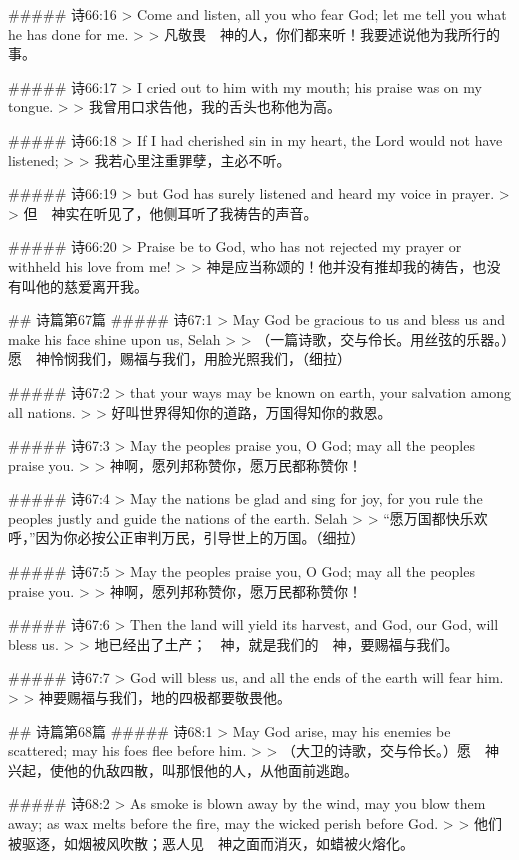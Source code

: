 ##### 诗66:16
> Come and listen, all you who fear God; let me tell you what he has done for me.
>
> 凡敬畏　神的人，你们都来听！我要述说他为我所行的事。


##### 诗66:17
> I cried out to him with my mouth; his praise was on my tongue.
>
> 我曾用口求告他，我的舌头也称他为高。


##### 诗66:18
> If I had cherished sin in my heart, the Lord would not have listened;
>
> 我若心里注重罪孽，主必不听。


##### 诗66:19
> but God has surely listened and heard my voice in prayer.
>
> 但　神实在听见了，他侧耳听了我祷告的声音。


##### 诗66:20
> Praise be to God, who has not rejected my prayer or withheld his love from me!
>
> 神是应当称颂的！他并没有推却我的祷告，也没有叫他的慈爱离开我。


## 诗篇第67篇
##### 诗67:1
> May God be gracious to us and bless us and make his face shine upon us, Selah
>
> （一篇诗歌，交与伶长。用丝弦的乐器。）愿　神怜悯我们，赐福与我们，用脸光照我们，（细拉）


##### 诗67:2
> that your ways may be known on earth, your salvation among all nations.
>
> 好叫世界得知你的道路，万国得知你的救恩。


##### 诗67:3
> May the peoples praise you, O God; may all the peoples praise you.
>
> 神啊，愿列邦称赞你，愿万民都称赞你！


##### 诗67:4
> May the nations be glad and sing for joy, for you rule the peoples justly and guide the nations of the earth. Selah
>
> “愿万国都快乐欢呼，”因为你必按公正审判万民，引导世上的万国。（细拉）


##### 诗67:5
> May the peoples praise you, O God; may all the peoples praise you.
>
> 神啊，愿列邦称赞你，愿万民都称赞你！


##### 诗67:6
> Then the land will yield its harvest, and God, our God, will bless us.
>
> 地已经出了土产；　神，就是我们的　神，要赐福与我们。


##### 诗67:7
> God will bless us, and all the ends of the earth will fear him.
>
> 神要赐福与我们，地的四极都要敬畏他。


## 诗篇第68篇
##### 诗68:1
> May God arise, may his enemies be scattered; may his foes flee before him.
>
> （大卫的诗歌，交与伶长。）愿　神兴起，使他的仇敌四散，叫那恨他的人，从他面前逃跑。


##### 诗68:2
> As smoke is blown away by the wind, may you blow them away; as wax melts before the fire, may the wicked perish before God.
>
> 他们被驱逐，如烟被风吹散；恶人见　神之面而消灭，如蜡被火熔化。


